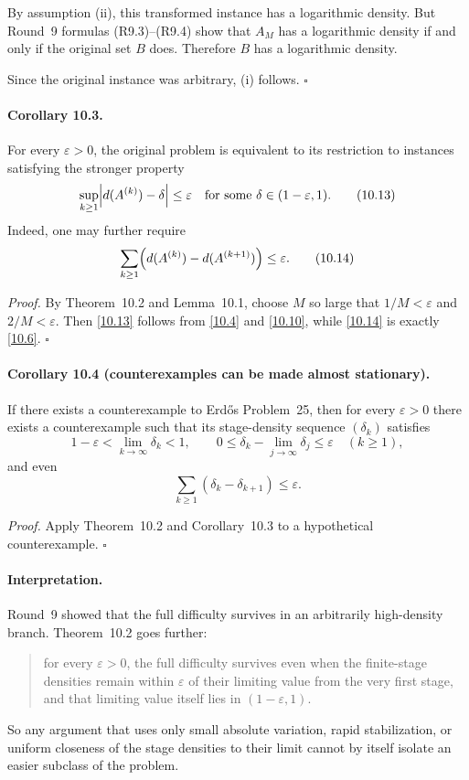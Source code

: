By assumption (ii), this transformed instance has a logarithmic density.  But Round~9 formulas (R9.3)--(R9.4) show that $A_M$ has a logarithmic density if and only if the original set $B$ does.  Therefore $B$ has a logarithmic density.

Since the original instance was arbitrary, (i) follows. \hfill $\square$

\paragraph{Corollary 10.3.}
For every $\varepsilon>0$, the original problem is equivalent to its restriction to instances satisfying the stronger property
\begin{equation}
\sup_{k\ge 1}\Bigl|d(A^{(k)})-\delta\Bigr|\le \varepsilon
\quad\text{for some }\delta\in(1-\varepsilon,1).
\tag{10.13}
\end{equation}
Indeed, one may further require
\begin{equation}
\sum_{k\ge 1}\Bigl(d(A^{(k)})-d(A^{(k+1)})\Bigr)\le \varepsilon.
\tag{10.14}
\end{equation}

\emph{Proof.}
By Theorem~10.2 and Lemma~10.1, choose $M$ so large that $1/M<\varepsilon$ and $2/M<\varepsilon$.  Then \eqref{10.13} follows from \eqref{10.4} and \eqref{10.10}, while \eqref{10.14} is exactly \eqref{10.6}. \hfill $\square$

\paragraph{Corollary 10.4 (counterexamples can be made almost stationary).}
If there exists a counterexample to Erd\H{o}s Problem~25, then for every $\varepsilon>0$ there exists a counterexample such that its stage-density sequence $(\delta_k)$ satisfies
\begin{equation}
1-\varepsilon<\lim_{k\to\infty}\delta_k<1,
\qquad
0\le \delta_k-\lim_{j\to\infty}\delta_j\le \varepsilon\quad (k\ge 1),
\tag{10.15}
\end{equation}
and even
\begin{equation}
\sum_{k\ge 1}(\delta_k-\delta_{k+1})\le \varepsilon.
\tag{10.16}
\end{equation}

\emph{Proof.}
Apply Theorem~10.2 and Corollary~10.3 to a hypothetical counterexample. \hfill $\square$

\paragraph{Interpretation.}
Round~9 showed that the full difficulty survives in an arbitrarily high-density branch.  Theorem~10.2 goes further:
\begin{quote}
for every $\varepsilon>0$, the full difficulty survives even when the finite-stage densities remain within $\varepsilon$ of their limiting value from the very first stage, and that limiting value itself lies in $(1-\varepsilon,1)$.
\end{quote}
So any argument that uses only small absolute variation, rapid stabilization, or uniform closeness of the stage densities to their limit cannot by itself isolate an easier subclass of the problem.

